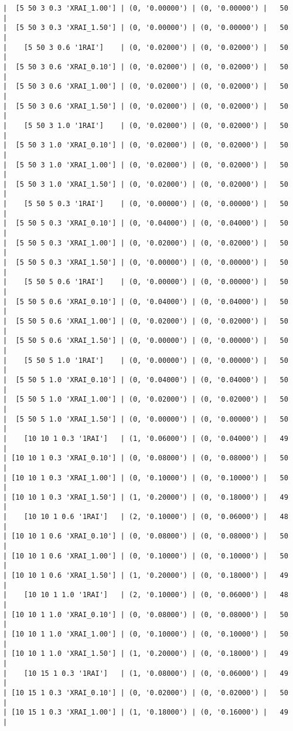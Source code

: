 \documentclass{article}
\begin{document}
\begin{verbatim}
|  [5 50 3 0.3 'XRAI_1.00'] | (0, '0.00000') | (0, '0.00000') |   50  |
|  [5 50 3 0.3 'XRAI_1.50'] | (0, '0.00000') | (0, '0.00000') |   50  |
|    [5 50 3 0.6 '1RAI']    | (0, '0.02000') | (0, '0.02000') |   50  |
|  [5 50 3 0.6 'XRAI_0.10'] | (0, '0.02000') | (0, '0.02000') |   50  |
|  [5 50 3 0.6 'XRAI_1.00'] | (0, '0.02000') | (0, '0.02000') |   50  |
|  [5 50 3 0.6 'XRAI_1.50'] | (0, '0.02000') | (0, '0.02000') |   50  |
|    [5 50 3 1.0 '1RAI']    | (0, '0.02000') | (0, '0.02000') |   50  |
|  [5 50 3 1.0 'XRAI_0.10'] | (0, '0.02000') | (0, '0.02000') |   50  |
|  [5 50 3 1.0 'XRAI_1.00'] | (0, '0.02000') | (0, '0.02000') |   50  |
|  [5 50 3 1.0 'XRAI_1.50'] | (0, '0.02000') | (0, '0.02000') |   50  |
|    [5 50 5 0.3 '1RAI']    | (0, '0.00000') | (0, '0.00000') |   50  |
|  [5 50 5 0.3 'XRAI_0.10'] | (0, '0.04000') | (0, '0.04000') |   50  |
|  [5 50 5 0.3 'XRAI_1.00'] | (0, '0.02000') | (0, '0.02000') |   50  |
|  [5 50 5 0.3 'XRAI_1.50'] | (0, '0.00000') | (0, '0.00000') |   50  |
|    [5 50 5 0.6 '1RAI']    | (0, '0.00000') | (0, '0.00000') |   50  |
|  [5 50 5 0.6 'XRAI_0.10'] | (0, '0.04000') | (0, '0.04000') |   50  |
|  [5 50 5 0.6 'XRAI_1.00'] | (0, '0.02000') | (0, '0.02000') |   50  |
|  [5 50 5 0.6 'XRAI_1.50'] | (0, '0.00000') | (0, '0.00000') |   50  |
|    [5 50 5 1.0 '1RAI']    | (0, '0.00000') | (0, '0.00000') |   50  |
|  [5 50 5 1.0 'XRAI_0.10'] | (0, '0.04000') | (0, '0.04000') |   50  |
|  [5 50 5 1.0 'XRAI_1.00'] | (0, '0.02000') | (0, '0.02000') |   50  |
|  [5 50 5 1.0 'XRAI_1.50'] | (0, '0.00000') | (0, '0.00000') |   50  |
|    [10 10 1 0.3 '1RAI']   | (1, '0.06000') | (0, '0.04000') |   49  |
| [10 10 1 0.3 'XRAI_0.10'] | (0, '0.08000') | (0, '0.08000') |   50  |
| [10 10 1 0.3 'XRAI_1.00'] | (0, '0.10000') | (0, '0.10000') |   50  |
| [10 10 1 0.3 'XRAI_1.50'] | (1, '0.20000') | (0, '0.18000') |   49  |
|    [10 10 1 0.6 '1RAI']   | (2, '0.10000') | (0, '0.06000') |   48  |
| [10 10 1 0.6 'XRAI_0.10'] | (0, '0.08000') | (0, '0.08000') |   50  |
| [10 10 1 0.6 'XRAI_1.00'] | (0, '0.10000') | (0, '0.10000') |   50  |
| [10 10 1 0.6 'XRAI_1.50'] | (1, '0.20000') | (0, '0.18000') |   49  |
|    [10 10 1 1.0 '1RAI']   | (2, '0.10000') | (0, '0.06000') |   48  |
| [10 10 1 1.0 'XRAI_0.10'] | (0, '0.08000') | (0, '0.08000') |   50  |
| [10 10 1 1.0 'XRAI_1.00'] | (0, '0.10000') | (0, '0.10000') |   50  |
| [10 10 1 1.0 'XRAI_1.50'] | (1, '0.20000') | (0, '0.18000') |   49  |
|    [10 15 1 0.3 '1RAI']   | (1, '0.08000') | (0, '0.06000') |   49  |
| [10 15 1 0.3 'XRAI_0.10'] | (0, '0.02000') | (0, '0.02000') |   50  |
| [10 15 1 0.3 'XRAI_1.00'] | (1, '0.18000') | (0, '0.16000') |   49  |

\end{verbatim}
\end{document}
